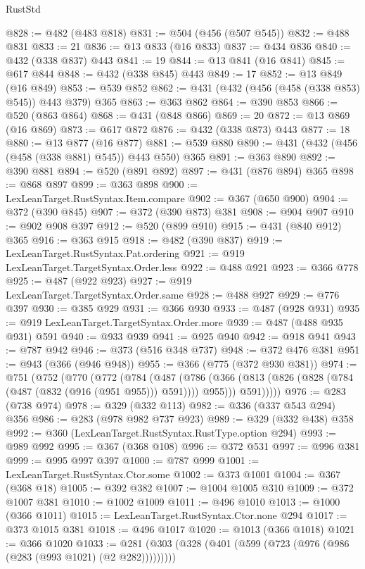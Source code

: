 \begin{lexlean}{RustStd}
\begin{coremodule}
@828 := @482 (@483 @818)
@831 := @504 (@456 (@507 @545))
@832 := @488 @831
@833 := 21
@836 := @13 @833 (@16 @833)
@837 := @434 @836
@840 := @432 (@338 @837) @443
@841 := 19
@844 := @13 @841 (@16 @841)
@845 := @617 @844
@848 := @432 (@338 @845) @443
@849 := 17
@852 := @13 @849 (@16 @849)
@853 := @539 @852
@862 := @431 (@432 (@456 (@458 (@338 @853) @545)) @443 @379) @365
@863 := @363 @862
@864 := @390 @853
@866 := @520 (@863 @864)
@868 := @431 (@848 @866)
@869 := 20
@872 := @13 @869 (@16 @869)
@873 := @617 @872
@876 := @432 (@338 @873) @443
@877 := 18
@880 := @13 @877 (@16 @877)
@881 := @539 @880
@890 := @431 (@432 (@456 (@458 (@338 @881) @545)) @443 @550) @365
@891 := @363 @890
@892 := @390 @881
@894 := @520 (@891 @892)
@897 := @431 (@876 @894) @365
@898 := @868 @897
@899 := @363 @898
@900 := LexLeanTarget.RustSyntax.Item.compare
@902 := @367 (@650 @900)
@904 := @372 (@390 @845)
@907 := @372 (@390 @873) @381
@908 := @904 @907
@910 := @902 @908 @397
@912 := @520 (@899 @910)
@915 := @431 (@840 @912) @365
@916 := @363 @915
@918 := @482 (@390 @837)
@919 := LexLeanTarget.RustSyntax.Pat.ordering
@921 := @919 LexLeanTarget.TargetSyntax.Order.less
@922 := @488 @921
@923 := @366 @778
@925 := @487 (@922 @923)
@927 := @919 LexLeanTarget.TargetSyntax.Order.same
@928 := @488 @927
@929 := @776 @397
@930 := @385 @929
@931 := @366 @930
@933 := @487 (@928 @931)
@935 := @919 LexLeanTarget.TargetSyntax.Order.more
@939 := @487 (@488 @935 @931) @591
@940 := @933 @939
@941 := @925 @940
@942 := @918 @941
@943 := @787 @942
@946 := @373 (@516 @348 @737)
@948 := @372 @476 @381
@951 := @943 (@366 (@946 @948))
@955 := @366 (@775 (@372 @930 @381))
@974 := @751
    (@752
      (@770
        (@772
          (@784
            (@487
              (@786 (@366 (@813 (@826 (@828 (@784 (@487 (@832 (@916 (@951 @955))) @591)))) @955)))
              @591)))))
@976 := @283 (@738 @974)
@978 := @329 (@332 @113)
@982 := @336 (@337 @543 @294) @356
@986 := @283 (@978 @982 @737 @923)
@989 := @329 (@332 @438) @358
@992 := @360 (LexLeanTarget.RustSyntax.RustType.option @294)
@993 := @989 @992
@995 := @367 (@368 @108)
@996 := @372 @531
@997 := @996 @381
@999 := @995 @997 @397
@1000 := @787 @999
@1001 := LexLeanTarget.RustSyntax.Ctor.some
@1002 := @373 @1001
@1004 := @367 (@368 @18)
@1005 := @392 @382
@1007 := @1004 @1005 @310
@1009 := @372 @1007 @381
@1010 := @1002 @1009
@1011 := @496 @1010
@1013 := @1000 (@366 @1011)
@1015 := LexLeanTarget.RustSyntax.Ctor.none @294
@1017 := @373 @1015 @381
@1018 := @496 @1017
@1020 := @1013 (@366 @1018)
@1021 := @366 @1020
@1033 := @281 (@303 (@328 (@401 (@599 (@723 (@976 (@986 (@283 (@993 @1021) (@2 @282)))))))))

\end{coremodule}
\end{lexlean}
